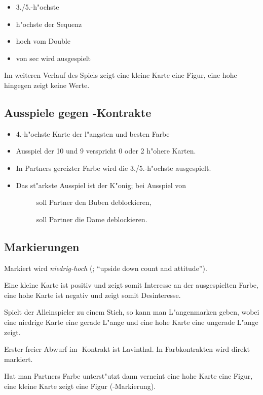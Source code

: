\begin{itemize}
\item 3./5.-h"ochste
\item h"ochste der Sequenz
\item hoch vom Double
\item von  sec wird  ausgespielt
\end{itemize}

Im weiteren Verlauf des Spiels zeigt eine kleine Karte eine
Figur, eine hohe hingegen zeigt keine Werte.

\subsection{Ausspiele gegen \sa-Kontrakte}

\begin{itemize}
\item 4.-h"ochste Karte der l"angsten und besten Farbe
\item Ausspiel der 10 und 9 verspricht 0 oder 2 h"ohere Karten.
\item In Partners gereizter Farbe wird die 3./5.-h"ochste ausgespielt.
\item Das st"arkste Ausspiel ist der K"onig; bei Ausspiel von
	\begin{description}
	\item[] soll Partner den Buben deblockieren,
	\item[] soll Partner die Dame deblockieren.
	\end{description}
\end{itemize}

\subsection{Markierungen}

Markiert wird \emph{niedrig-hoch} (; "`upside down count and attitude"').

Eine kleine Karte ist positiv und zeigt somit Interesse an der ausgespielten
Farbe, eine hohe Karte ist negativ und zeigt somit Desinteresse.

Spielt der Alleinspieler zu einem Stich, so kann man L"angenmarken geben, wobei eine niedrige
Karte eine gerade L"ange und eine hohe Karte eine ungerade L"ange zeigt.

Erster freier Abwurf im \sa-Kontrakt ist Lavinthal. In Farbkontrakten wird
direkt markiert.

Hat man Partners Farbe unterst"utzt dann verneint eine hohe Karte eine Figur,
eine kleine Karte zeigt eine Figur (-Markierung).

